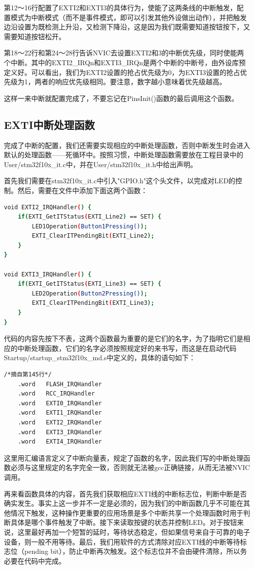 		\par 
		第12～16行配置了EXTI2和EXTI3的具体行为，使能了这两条线的中断触发，配置模式为中断模式（而不是事件模式，即可以引发其他外设做出动作），并把触发边沿设置为既检测上升沿，又检测下降沿，这是因为我们既需要知道按钮按下，又需要知道按钮松开。
		\par 
		第18～22行和第24～28行告诉NVIC去设置EXTI2和3的中断优先级，同时使能两个中断。其中的EXTI2\_IRQn和EXTI3\_IRQn是两个中断的中断号，由外设库预定义好。可以看出，我们为EXTI2设置的抢占优先级为0，为EXTI3设置的抢占优先级为1，两者的响应优先级相同。要注意，数字越小意味着优先级越高。
		\par 
		这样一来中断就配置完成了，不要忘记在PinsInit()函数的最后调用这个函数。
		
	\subsection{EXTI中断处理函数}
		完成了中断的配置，我们还需要实现相应的中断处理函数，否则中断发生时会进入默认的处理函数——死循环中。按照习惯，中断处理函数需要放在工程目录中的User/stm32f10x\_it.c中，并在User/stm32f10x\_it.h中给出声明。
		\par 
		首先我们需要在stm32f10x\_it.c中引入"GPIO.h"这个头文件，以完成对LED的控制。然后，需要在文件中添加下面这两个函数：
		\par 
		\begin{lstlisting}[language=bash, style=customStyleC, caption=中断处理函数]
void EXTI2_IRQHandler() {
	if(EXTI_GetITStatus(EXTI_Line2) == SET) {
		LED1Operation(Button1Pressing());
		EXTI_ClearITPendingBit(EXTI_Line2);
	}
}

void EXTI3_IRQHandler() {
	if(EXTI_GetITStatus(EXTI_Line3) == SET) {
		LED2Operation(Button2Pressing());
		EXTI_ClearITPendingBit(EXTI_Line3);
	}
}
		\end{lstlisting}
		\par 
		代码的内容先按下不表，这两个函数最为重要的是它们的名字，为了指明它们是相应的中断处理函数，它们的名字必须按照规定好的来书写，而这是在启动代码Startup/startup\_stm32f10x\_md.s中定义的，具体的语句如下：
		\par 
		\begin{lstlisting}[language=bash, style=customStyleC]
/*摘自第145行*/
	.word	FLASH_IRQHandler
	.word	RCC_IRQHandler
	.word	EXTI0_IRQHandler
	.word	EXTI1_IRQHandler
	.word	EXTI2_IRQHandler
	.word	EXTI3_IRQHandler
	.word	EXTI4_IRQHandler
		\end{lstlisting}
		\par 
		这里用汇编语言定义了中断向量表，规定了函数的名字，因此我们写的中断处理函数必须与这里规定的名字完全一致，否则就无法被gcc正确链接，从而无法被NVIC调用。
		\par
		再来看函数具体的内容，首先我们获取相应EXTI线的中断标志位，判断中断是否确实发生。事实上这一步并不一定是必须的，因为我们的中断函数几乎不可能在其他情况下触发，这种操作更重要的应用场景是多个中断共享一个处理函数时用于判断具体是哪个事件触发了中断。接下来读取按键的状态并控制LED。对于按钮来说，这里最好再加一个短暂的延时，等待状态稳定，但如果信号来自于可靠的电子设备，则一般不用等待。最后，我们用软件的方式清除对应EXTI线的中断等待标志位（pending bit），防止中断再次触发。这个标志位并不会由硬件清除，所以务必要在代码中完成。
